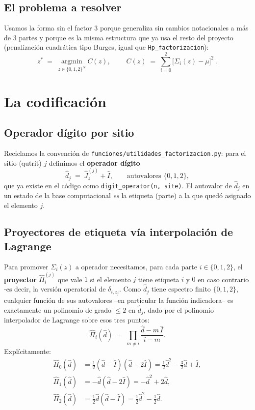 \documentclass[11pt]{article}
\newcommand{\op}[1]{\hat{#1}}
\newcommand{\Jz}{\op{J}_z}
\begin{document}
\subsection{El problema a resolver}

Usamos la forma sin el factor $3$ porque generaliza sin cambios
notacionales a m\'as de 3 partes y porque es la misma estructura que ya
usa el resto del proyecto (penalizaci\'on cuadr\'atica tipo Burges, igual
que \texttt{Hp\_factorizacion}):
\[
  z^\ast \;=\; \operatorname*{argmin}_{z\in\{0,1,2\}^N} C(z),
  \qquad
  \boxed{\; C(z) \;=\; \sum_{i=0}^{2} \big[\Sigma_i(z)-\mu\big]^2 \;}.
\]

\section{La codificaci\'on}

\subsection{Operador d\'igito por sitio}

Reciclamos la convenci\'on de \texttt{funciones/utilidades\_factorizacion.py}:
para el sitio (qutrit) $j$ definimos el \textbf{operador d\'igito}
\[
  \op{d}_j \;=\; \Jz^{(j)} + \op{I}, \qquad \text{autovalores } \{0,1,2\},
\]
que ya existe en el c\'odigo como \texttt{digit\_operator(n, site)}. El
autovalor de $\op{d}_j$ en un estado de la base computacional \emph{es} la
etiqueta (parte) a la que qued\'o asignado el elemento $j$.

\subsection{Proyectores de etiqueta v\'ia interpolaci\'on de Lagrange}

Para promover $\Sigma_i(z)$ a operador necesitamos, para cada parte
$i\in\{0,1,2\}$, el \textbf{proyector} $\op\Pi_i^{(j)}$ que vale $1$ si el
elemento $j$ tiene etiqueta $i$ y $0$ en caso contrario -es decir, la
versi\'on operatorial de $\delta_{i,z_j}$. Como $\op{d}_j$ tiene espectro
finito $\{0,1,2\}$, cualquier funci\'on de sus autovalores --en particular
la funci\'on indicadora-- es exactamente un polinomio de grado $\leq2$ en
$\op{d}_j$, dado por el polinomio interpolador de Lagrange sobre esos tres
puntos:
\[
  \op\Pi_i(\op{d}) \;=\; \prod_{m\neq i} \frac{\op{d}-m\,\op{I}}{i-m}.
\]
Expl\'icitamente:
\begin{align}
  \op\Pi_0(\op{d}) &= \tfrac12(\op{d}-\op{I})(\op{d}-2\op{I})
    = \tfrac12\op{d}^2 - \tfrac32\op{d} + \op{I}, \\
  \op\Pi_1(\op{d}) &= -\op{d}(\op{d}-2\op{I})
    = -\op{d}^2 + 2\op{d}, \\
  \op\Pi_2(\op{d}) &= \tfrac12\op{d}(\op{d}-\op{I})
    = \tfrac12\op{d}^2 - \tfrac12\op{d}.
\end{align}
\end{document}
